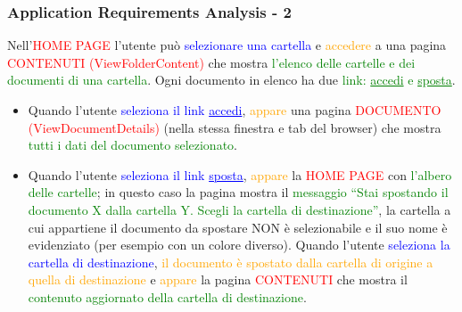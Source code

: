 \documentclass[aspectratio=169, dvipsnames]{beamer}
\begin{document}
\begin{frame}
    \frametitle{Application Requirements Analysis - 2}
    Nell’\textcolor{Red}{HOME PAGE} l’utente può \textcolor{Blue}{selezionare una cartella} e
    \textcolor{Orange}{accedere} a una pagina \textcolor{Red}{CONTENUTI (ViewFolderContent)} che mostra
    \textcolor{Green}{l’elenco delle cartelle e dei documenti di una cartella}. Ogni documento in elenco ha due
    \textcolor{Green}{link: \underline{accedi} e \underline{sposta}}.\footnotemark{}

    \begin{itemize}
        \item Quando l’utente \textcolor{Blue}{seleziona il link \underline{accedi}}, \textcolor{Orange}{appare} una
              pagina \textcolor{Red}{DOCUMENTO (ViewDocumentDetails)} (nella stessa finestra e tab del browser) che
              mostra \textcolor{Green}{tutti i dati del documento selezionato}.
        \item Quando l’utente \textcolor{Blue}{seleziona il link \underline{sposta}}, \textcolor{Orange}{appare} la
              \textcolor{Red}{HOME PAGE} con \textcolor{Green}{l’albero delle cartelle}; in questo caso la pagina
              mostra il \textcolor{Green}{messaggio “Stai spostando il documento X dalla cartella Y. Scegli la cartella
                  di destinazione”}, la cartella a cui appartiene il documento da spostare NON è selezionabile e il suo
              nome è evidenziato (per esempio con un colore diverso). Quando l’utente \textcolor{Blue}{seleziona la
                  cartella di destinazione}, \textcolor{Orange}{il documento è spostato dalla cartella di origine a
                  quella di destinazione} e \textcolor{Orange}{appare} la pagina \textcolor{Red}{CONTENUTI} che mostra
              il \textcolor{Green}{contenuto aggiornato della cartella di destinazione}.
    \end{itemize}
\end{frame}
\end{document}
